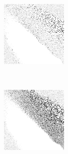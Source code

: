 \begin{figure}
\begin{subfigure}[t]{0.22\textwidth}
		\caption{\handmaxavg}
	\end{subfigure}
	~
	\begin{subfigure}[t]{0.22\textwidth}
		\includegraphics[width=\textwidth]{images/findings/experiments/randomization/strats/hand_max_med.png}
		\caption{\handmaxmed}
	\end{subfigure}
	~
	\begin{subfigure}[t]{0.22\textwidth}
		\includegraphics[width=\textwidth]{images/findings/experiments/randomization/strats/hand_max_poss.png}
		\caption{\handmaxposs}
	\end{subfigure}


\end{figure}
